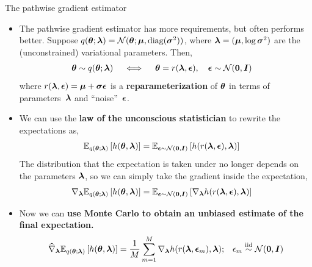 \documentclass[aspectratio=169]{beamer}
\begin{document}
\begin{frame}[t]{The pathwise gradient estimator}
\begin{itemize}
    \item<1-> The pathwise gradient estimator has more requirements, but often performs better. Suppose $q(\boldsymbol{\theta}; \boldsymbol{\lambda}) = \mathcal{N}(\boldsymbol{\theta}; \boldsymbol{\mu}, \textrm{diag}(\boldsymbol{\sigma}^2))$, where $\boldsymbol{\lambda} = (\boldsymbol{\mu}, \log \boldsymbol{\sigma}^2)$ are the (unconstrained) variational parameters. Then,
    \begin{align*}
        \boldsymbol{\theta} \sim q(\boldsymbol{\theta}; \boldsymbol{\lambda}) \quad \iff \quad
        \boldsymbol{\theta} &= r(\boldsymbol{\lambda}, \boldsymbol{\epsilon}), \quad \boldsymbol{\epsilon} \sim \mathcal{N}(\boldsymbol{0}, \boldsymbol{I}) 
    \end{align*}
    where $r(\boldsymbol{\lambda}, \boldsymbol{\epsilon}) = \boldsymbol{\mu} + \boldsymbol{\sigma} \boldsymbol{\epsilon}$ is a \textbf{reparameterization} of $\boldsymbol{\theta}$ in terms of parameters~$\boldsymbol{\lambda}$ and ``noise''~$\boldsymbol{\epsilon}$.

    \item<2-> We can use the \textbf{law of the unconscious statistician} to rewrite the expectations as,
    \begin{align*}
        \mathbb{E}_{q(\boldsymbol{\theta}; \boldsymbol{\lambda})} \left[h(\boldsymbol{\theta}, \boldsymbol{\lambda}) \right]
        &= \mathbb{E}_{\boldsymbol{\epsilon} \sim \mathcal{N}(\boldsymbol{0}, \boldsymbol{I})} \left[h(r(\boldsymbol{\lambda}, \boldsymbol{\epsilon}), \boldsymbol{\lambda}) \right]
    \end{align*}
    The distribution that the expectation is taken under no longer depends on the parameters $\boldsymbol{\lambda}$, so we can simply take the gradient inside the expectation,
    \begin{align*}
        \nabla_{\boldsymbol{\lambda}} \mathbb{E}_{q(\boldsymbol{\theta}; \boldsymbol{\lambda})} \left[h(\boldsymbol{\theta}, \boldsymbol{\lambda}) \right]
        &=  \mathbb{E}_{\boldsymbol{\epsilon} \sim \mathcal{N}(\boldsymbol{0}, \boldsymbol{I})} \left[\nabla_{\boldsymbol{\lambda}} h(r(\boldsymbol{\lambda}, \boldsymbol{\epsilon}), \boldsymbol{\lambda}) \right]
    \end{align*}

    \item<3->Now we can \textbf{use Monte Carlo to obtain an unbiased estimate of the final expectation.}
    \begin{align*}
        \widehat{\nabla}_{\boldsymbol{\lambda}} \mathbb{E}_{q(\boldsymbol{\theta}; \boldsymbol{\lambda})} \left[h(\boldsymbol{\theta}, \boldsymbol{\lambda}) \right]
        &= \frac{1}{M} \sum_{m=1}^M \nabla_{\boldsymbol{\lambda}} h(r(\boldsymbol{\lambda}, \boldsymbol{\epsilon}_m), \boldsymbol{\lambda}); & \epsilon_m \stackrel{\text{iid}}{\sim} \mathcal{N}(\boldsymbol{0}, \boldsymbol{I})
    \end{align*}
    
\end{itemize}
\end{frame}
\end{document}
